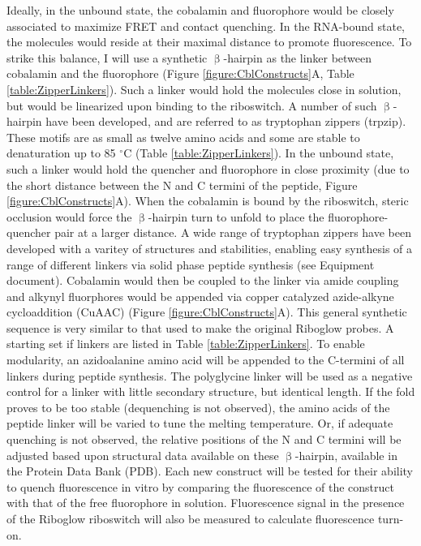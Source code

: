 Ideally, in the unbound state, the cobalamin and fluorophore would be closely associated to maximize FRET and contact quenching\cite{RosendahlSynthesisbiologicalactivity1982,ShellVitaminB12Tunable2015,ShellTunableVisibleNearIR2014}.
In the RNA-bound state, the molecules would reside at their maximal distance to promote fluorescence\cite{LeeDesignSynthesisCharacterization2009}.
To strike this balance, I will use a synthetic $\upbeta$-hairpin as the linker between cobalamin and the fluorophore (Figure \ref{figure:CblConstructs}A, Table \ref{table:ZipperLinkers}).
Such a linker would hold the molecules close in solution, but would be linearized upon binding to the riboswitch.
A number of such $\upbeta$-hairpin have been developed, and are referred to as tryptophan zippers (trpzip)\cite{CochranTryptophanzippersStable2001}.
These motifs are as small as twelve amino acids and some are stable to denaturation up to 85 $^\circ$C (Table \ref{table:ZipperLinkers}).
In the unbound state, such a linker would hold the quencher and fluorophore in close proximity (due to the short distance between the N and C termini of the peptide, Figure \ref{figure:CblConstructs}A).
When the cobalamin is bound by the riboswitch, steric occlusion would force the $\upbeta$-hairpin turn to unfold to place the fluorophore-quencher pair at a larger distance.
A wide range of tryptophan zippers have been developed with a varitey of structures and stabilities, enabling easy synthesis of a range of different linkers via solid phase peptide synthesis\cite{CochranTryptophanzippersStable2001,KierProbingLowerSize2008,AndersenMinimizationOptimizationDesigned2006,FesinmeyerEnhancedHairpinStability2004} (see Equipment document).
Cobalamin would then be coupled to the linker via amide coupling and alkynyl fluorphores would be appended via copper catalyzed azide-alkyne cycloaddition (CuAAC)\cite{KolbHartmuthC.ClickChemistryDiverse2001,PattersonFindingRightBioorthogonal2014} (Figure \ref{figure:CblConstructs}A).
This general synthetic sequence is very similar to that used to make the original Riboglow probes\cite{BraselmannDevelopmentriboswitchbasedplatform2017}.
A starting set if linkers are listed in Table \ref{table:ZipperLinkers}.
To enable modularity, an azidoalanine amino acid will be appended to the C-termini of all linkers during peptide synthesis.
The polyglycine linker will be used as a negative control for a linker with little secondary structure, but identical length.
If the fold proves to be too stable (dequenching is not observed), the amino acids of the peptide linker will be varied to tune the melting temperature.
Or, if adequate quenching is not observed, the relative positions of the N and C termini will be adjusted based upon structural data available on these $\upbeta$-hairpin, available in the Protein Data Bank (PDB).
Each new construct will be tested for their ability to quench fluorescence in vitro by comparing the fluorescence of the construct with that of the free fluorophore in solution. Fluorescence signal in the presence of the Riboglow riboswitch will also be measured to calculate fluorescence turn-on.


